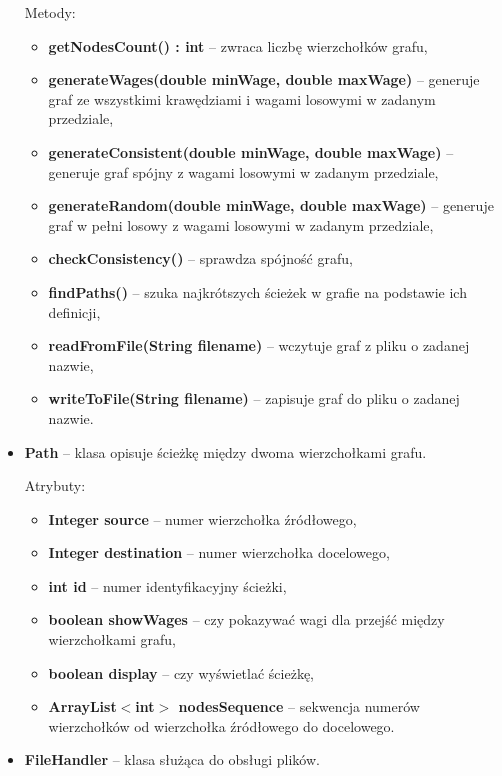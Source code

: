 \documentclass{article}
\begin{document}
\begin{itemize}
    Metody:
    \begin{itemize}
        \item \textbf{getNodesCount() : int} -- zwraca liczbę wierzchołków grafu,
        \item \textbf{generateWages(double minWage, double maxWage)} -- generuje graf ze wszystkimi krawędziami i wagami losowymi w zadanym przedziale,
        \item \textbf{generateConsistent(double minWage, double maxWage)} -- generuje graf spójny z wagami losowymi w zadanym przedziale,
        \item \textbf{generateRandom(double minWage, double maxWage)} -- generuje graf w pełni losowy z wagami losowymi w zadanym przedziale,
        \item \textbf{checkConsistency()} -- sprawdza spójność grafu,
        \item \textbf{findPaths()} -- szuka najkrótszych ścieżek w grafie na podstawie ich definicji,
        \item \textbf{readFromFile(String filename)} -- wczytuje graf z pliku o zadanej nazwie,
        \item \textbf{writeToFile(String filename)} -- zapisuje graf do pliku o zadanej nazwie.
    \end{itemize}
    
\newpage
    
    \item \textbf{Path} -- klasa opisuje ścieżkę między dwoma wierzchołkami grafu.
    
    Atrybuty:
    \begin{itemize}
        \item \textbf{Integer source} -- numer wierzchołka źródłowego,
        \item \textbf{Integer destination} -- numer wierzchołka docelowego,
        \item \textbf{int id} -- numer identyfikacyjny ścieżki,
        \item \textbf{boolean showWages} -- czy pokazywać wagi dla przejść między wierzchołkami grafu,
        \item \textbf{boolean display} -- czy wyświetlać ścieżkę,
        \item \textbf{ArrayList$<$int$>$ nodesSequence} -- sekwencja numerów wierzchołków od wierzchołka źródłowego do docelowego.
    \end{itemize}
    
    \item \textbf{FileHandler} -- klasa służąca do obsługi plików.
    

\end{itemize}
\end{document}
